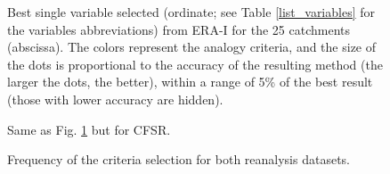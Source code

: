 \documentclass[draft]{agujournal2019}
\begin{document}
\begin{figure}[hbt]
	\noindent{}
	\caption{Best single variable selected (ordinate; see Table \ref{list_variables} for the variables abbreviations) from ERA-I for the 25 catchments (abscissa). The colors represent the analogy criteria, and the size of the dots is proportional to the accuracy of the resulting method (the larger the dots, the better), within a range of 5\% of the best result (those with lower accuracy are hidden).}
	\label{fig_best_era_int}
\end{figure}

\begin{figure}[hbt]
	\noindent{}
	\caption{Same as Fig. \ref{fig_best_era_int} but for CFSR.}
	\label{fig_best_cfsr}
\end{figure}

\begin{figure}[hbt]
	\noindent{}
	\caption{Frequency of the criteria selection for both reanalysis datasets.}
	\label{fig_criteria}
\end{figure}
\end{document}
